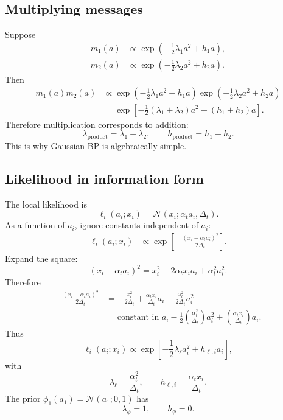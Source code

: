 \documentclass[11pt]{article}
\newcommand{\N}{\mathcal{N}}
\begin{document}
\subsection{Multiplying messages}

Suppose
\begin{align}
  m_1(a)&\propto \exp\left(-\frac12\lambda_1a^2+h_1a\right),\\
  m_2(a)&\propto \exp\left(-\frac12\lambda_2a^2+h_2a\right).
\end{align}
Then
\begin{align}
  m_1(a)m_2(a)
  &\propto
  \exp\left(-\frac12\lambda_1a^2+h_1a\right)
  \exp\left(-\frac12\lambda_2a^2+h_2a\right) \\
  &=
  \exp\left[-\frac12(\lambda_1+\lambda_2)a^2+(h_1+h_2)a\right].
\end{align}
Therefore multiplication corresponds to addition:
\begin{equation}
  \lambda_{\text{product}}=\lambda_1+\lambda_2,
  \qquad
  h_{\text{product}}=h_1+h_2.
  \label{eq:info-addition}
\end{equation}
This is why Gaussian BP is algebraically simple.

\subsection{Likelihood in information form}

The local likelihood is
\begin{equation}
  \ell_i(a_i;x_i)
  =\N(x_i;\alpha_t a_i,\Delta_t).
\end{equation}
As a function of \(a_i\), ignore constants independent of \(a_i\):
\begin{align}
  \ell_i(a_i;x_i)
  &\propto
  \exp\left[-\frac{(x_i-\alpha_t a_i)^2}{2\Delta_t}\right].
\end{align}
Expand the square:
\begin{equation}
  (x_i-\alpha_t a_i)^2=x_i^2-2\alpha_t x_i a_i+\alpha_t^2a_i^2.
\end{equation}
Therefore
\begin{align}
  -\frac{(x_i-\alpha_t a_i)^2}{2\Delta_t}
  &=-\frac{x_i^2}{2\Delta_t}
  +\frac{\alpha_t x_i}{\Delta_t}a_i
  -\frac{\alpha_t^2}{2\Delta_t}a_i^2 \\
  &=\text{constant in }a_i
  -\frac12\left(\frac{\alpha_t^2}{\Delta_t}\right)a_i^2
  +\left(\frac{\alpha_t x_i}{\Delta_t}\right)a_i.
\end{align}
Thus
\begin{equation}
  \ell_i(a_i;x_i)
  \propto
  \exp\left[-\frac12\lambda_\ell a_i^2+h_{\ell,i}a_i\right],
\end{equation}
with
\begin{equation}
  \lambda_\ell=\frac{\alpha_t^2}{\Delta_t},
  \qquad
  h_{\ell,i}=\frac{\alpha_t x_i}{\Delta_t}.
  \label{eq:likelihood-info}
\end{equation}
The prior \(\phi_1(a_1)=\N(a_1;0,1)\) has
\begin{equation}
  \lambda_\phi=1,
  \qquad
  h_\phi=0.
\end{equation}
\end{document}
